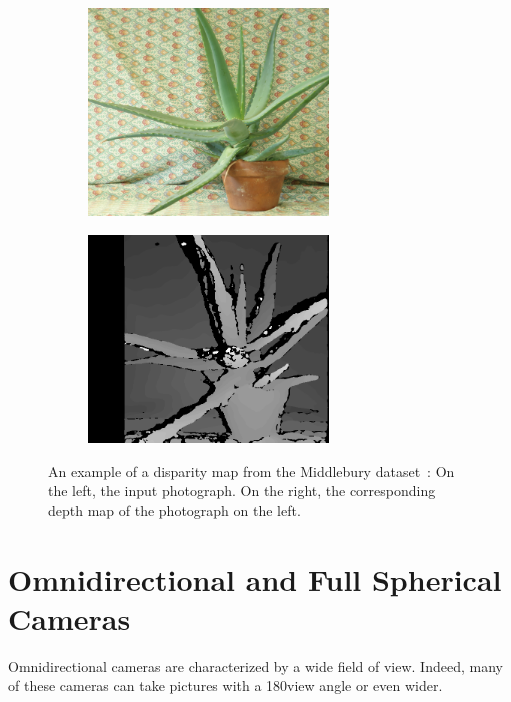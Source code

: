 \begin{figure}[h]
	\centering
	\begin{subfigure}{0.4\textwidth}
		\centering
		\includegraphics[width=0.7\textwidth]{img/aloe_view1}        
	\end{subfigure}
	\begin{subfigure}{0.4\textwidth}
		\centering
		\includegraphics[width=0.7\textwidth]{img/aloe_disparity}
	\end{subfigure}
	\caption{\label{fig:disparity_example}An example of a disparity map from the
	Middlebury dataset~\cite{hirschmuller2007evaluation}: On the left, the input
    photograph. On the right, the corresponding depth map of the photograph on the left.}
\end{figure}

\section{Omnidirectional and Full Spherical Cameras}
\label{sec:cameraclassification}
Omnidirectional cameras are characterized by a wide field of view. Indeed, many of these cameras can take pictures with a 180\degree view angle or even wider.

